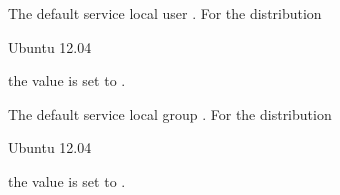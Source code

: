 
The default service local user .
For the distribution
\begin{inparaitem}
\item[\TheDistribution{ubuntu}] Ubuntu 12.04
\end{inparaitem}
the value is set to .


The default service local group .
For the distribution
\begin{inparaitem}
\item[\TheDistribution{ubuntu}] Ubuntu 12.04
\end{inparaitem}
the value is set to .
